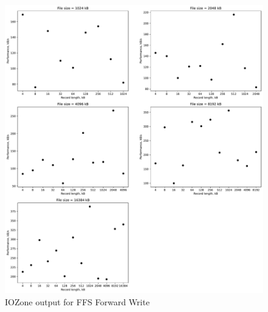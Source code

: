 \begin{figure}[!htb]
	\label{fig:app_bench_ffs_rnd_read}
	\begin{center}
		\includegraphics[width=1.0\textwidth]{figures/benchmarking/ffs/Writer.pdf}
	\end{center}
	\caption{IOZone output for FFS Forward Write}
\end{figure}

